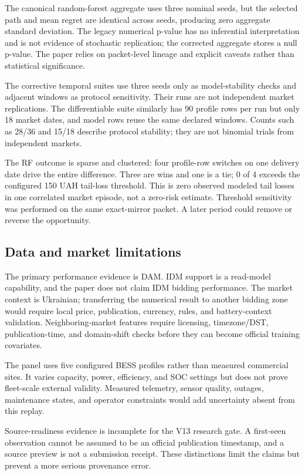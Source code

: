 The canonical random-forest aggregate uses three nominal seeds, but the selected path and mean regret are identical across seeds, producing zero aggregate standard deviation. The legacy numerical p-value has no inferential interpretation and is not evidence of stochastic replication; the corrected aggregate stores a null p-value. The paper relies on packet-level lineage and explicit caveats rather than statistical significance.

The corrective temporal suites use three seeds only as model-stability checks and adjacent windows as protocol sensitivity. Their runs are not independent market replications. The differentiable suite similarly has 90 profile rows per run but only 18 market dates, and model rows reuse the same declared windows. Counts such as 28/36 and 15/18 describe protocol stability; they are not binomial trials from independent markets.

The RF outcome is sparse and clustered: four profile-row switches on one delivery date drive the entire difference. Three are wins and one is a tie; 0 of 4 exceeds the configured 150 UAH tail-loss threshold. This is zero observed modeled tail losses in one correlated market episode, not a zero-risk estimate. Threshold sensitivity was performed on the same exact-mirror packet. A later period could remove or reverse the opportunity.

\subsection{Data and market limitations}

The primary performance evidence is DAM. IDM support is a read-model capability, and the paper does not claim IDM bidding performance. The market context is Ukrainian; transferring the numerical result to another bidding zone would require local price, publication, currency, rules, and battery-context validation. Neighboring-market features require licensing, timezone/DST, publication-time, and domain-shift checks before they can become official training covariates.

The panel uses five configured BESS profiles rather than measured commercial sites. It varies capacity, power, efficiency, and SOC settings but does not prove fleet-scale external validity. Measured telemetry, sensor quality, outages, maintenance states, and operator constraints would add uncertainty absent from this replay.

Source-readiness evidence is incomplete for the V13 research gate. A first-seen observation cannot be assumed to be an official publication timestamp, and a source preview is not a submission receipt. These distinctions limit the claims but prevent a more serious provenance error.

